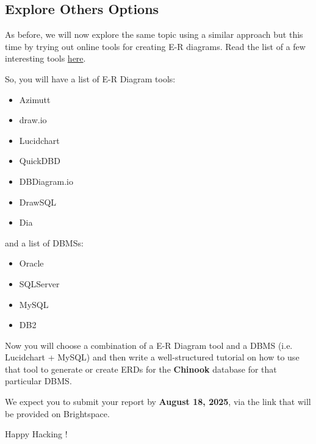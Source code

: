 \documentclass{article}
\begin{document}
\subsection{Explore Others Options}
As before, we will now explore the same topic using a similar approach but this time by trying out online tools for creating E-R diagrams. Read the list of a few interesting tools \href{https://drive.google.com/file/d/1FEkgTJEXY07AtVxIYr1_qq0naw3rmOpu/view?usp=sharing}{here}.

So, you will have a list of E-R Diagram tools:

\begin{itemize}
    \item Azimutt
    \item draw.io
    \item Lucidchart
    \item QuickDBD
    \item DBDiagram.io
    \item DrawSQL
    \item Dia
\end{itemize}

and a list of DBMSs:

\begin{itemize}
    \item Oracle
    \item SQLServer
    \item MySQL
    \item DB2
\end{itemize}

Now you will choose a combination of a E-R Diagram tool and a DBMS (i.e. Lucidchart + MySQL) and then write a well-structured tutorial on how to use that tool to generate or create ERDs for the \textbf{Chinook} database for that particular DBMS.

We expect you to submit your report by \textbf{August 18, 2025}, via the link that will be provided on Brightspace.

\vspace{5mm}
Happy Hacking !
\end{document}
